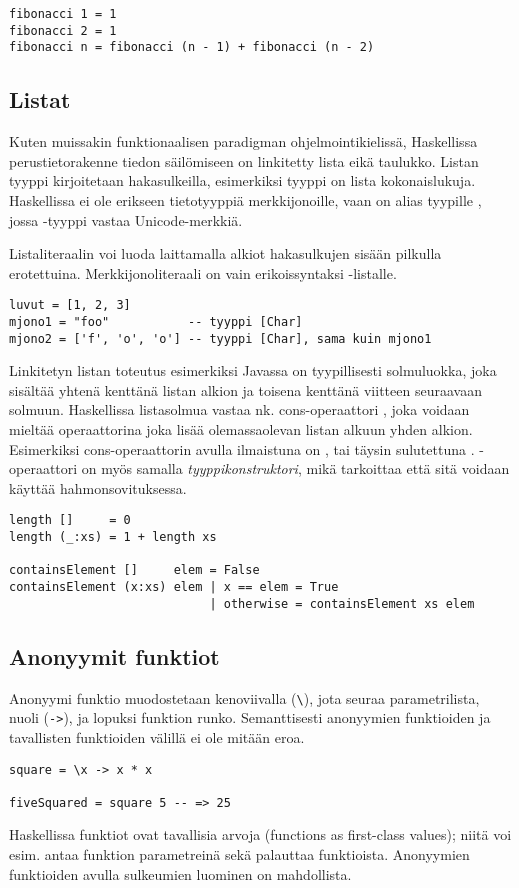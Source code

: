 \begin{verbatim}
fibonacci 1 = 1
fibonacci 2 = 1
fibonacci n = fibonacci (n - 1) + fibonacci (n - 2)
\end{verbatim}

\subsection{Listat}

Kuten muissakin funktionaalisen paradigman ohjelmointikielissä,
Haskellissa perustietorakenne tiedon säilömiseen on linkitetty lista eikä taulukko.
Listan tyyppi kirjoitetaan hakasulkeilla, esimerkiksi tyyppi \Haskell{[Integer]} on lista kokonaislukuja.
Haskellissa ei ole erikseen tietotyyppiä merkkijonoille,
vaan  on alias tyypille \Haskell{[Char]},
jossa -tyyppi vastaa Unicode-merkkiä.

Listaliteraalin voi luoda laittamalla alkiot hakasulkujen sisään pilkulla erotettuina.
Merkkijonoliteraali on vain erikoissyntaksi -listalle.
\begin{verbatim}
luvut = [1, 2, 3]
mjono1 = "foo"           -- tyyppi [Char]
mjono2 = ['f', 'o', 'o'] -- tyyppi [Char], sama kuin mjono1
\end{verbatim}

Linkitetyn listan toteutus esimerkiksi Javassa on tyypillisesti solmuluokka,
joka sisältää yhtenä kenttänä listan alkion ja toisena kenttänä viitteen seuraavaan solmuun.
Haskellissa listasolmua vastaa nk. cons-operaattori \Haskell{:}, joka voidaan
mieltää operaattorina joka lisää olemassaolevan listan alkuun yhden alkion.
Esimerkiksi \Haskell{[1, 2, 3]} cons-operaattorin avulla ilmaistuna on ,
tai täysin sulutettuna .
\Haskell{:}-operaattori on myös samalla \emph{tyyppikonstruktori},
mikä tarkoittaa että sitä voidaan käyttää hahmonsovituksessa.

\begin{verbatim}
length []     = 0
length (_:xs) = 1 + length xs

containsElement []     elem = False
containsElement (x:xs) elem | x == elem = True
                            | otherwise = containsElement xs elem
\end{verbatim}

\subsection{Anonyymit funktiot}
Anonyymi funktio muodostetaan kenoviivalla (\texttt{\textbackslash}), jota seuraa
parametrilista, nuoli (\texttt{->}), ja lopuksi funktion runko.
Semanttisesti anonyymien funktioiden ja tavallisten funktioiden välillä ei ole mitään eroa.
\begin{verbatim}
square = \x -> x * x

fiveSquared = square 5 -- => 25
\end{verbatim}
Haskellissa funktiot ovat tavallisia arvoja (functions as first-class values);
niitä voi esim. antaa funktion parametreinä sekä palauttaa funktioista.
Anonyymien funktioiden avulla sulkeumien luominen on mahdollista.

